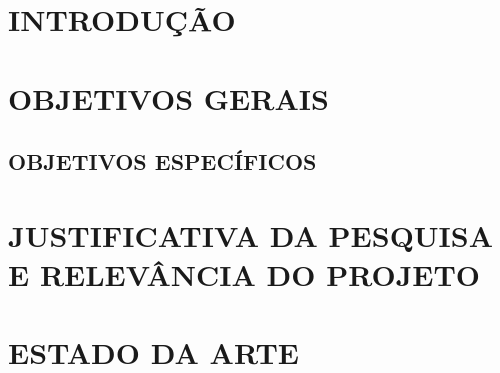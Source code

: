 \documentclass[
	article,			%
	12pt,				%
	oneside,			%
	a4paper,			%
	section=TITLE,		%
	subsection=TITLE,	%
	english,			%
	brazil,				%
	sumario=tradicional
	]{abntex2}
\begin{document}


\imprimircapa





\textual


\section{INTRODUÇÃO}

\cite{zhang2012survey}   

\section{OBJETIVOS GERAIS}


\subsection{OBJETIVOS ESPECÍFICOS}
    
    

\section{JUSTIFICATIVA DA PESQUISA E RELEVÂNCIA DO PROJETO}


\section{ESTADO DA ARTE}
\end{document}
